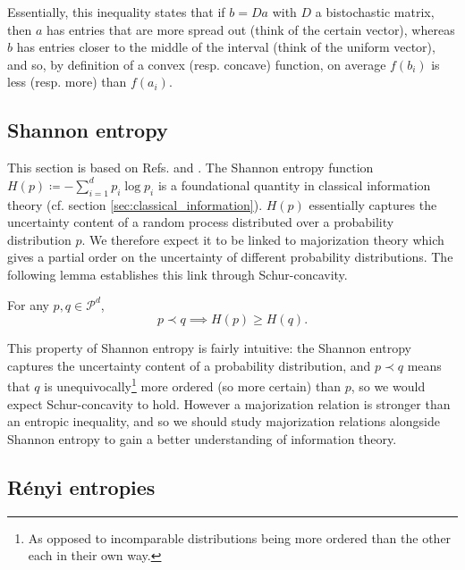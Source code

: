 Essentially, this inequality states that if $b = Da$ with $D$ a bistochastic matrix, then $a$ has entries that are more spread out (think of the certain vector), whereas $b$ has entries closer to the middle of the interval (think of the uniform vector), and so, by definition of a convex (resp. concave) function, on average $f(b_i)$ is less (resp. more) than $f(a_i)$.



\subsection{Shannon entropy} \label{sec:schur_shannon}

This section is based on Refs. \cite[p. 101]{marshall_inequalities_2011} and \cite[p. 88]{cover_elements_2006}. %
The Shannon entropy function $H(p) \coloneqq - \sum_{i = 1}^{d} p_i \log p_i$ is a foundational quantity in classical information theory (cf. section \ref{sec:classical_information}). $H(p)$ essentially captures the uncertainty content of a random process distributed over a probability distribution $p$. We therefore expect it to be linked to majorization theory which gives a partial order on the uncertainty of different probability distributions. The following lemma establishes this link through Schur-concavity.

\begin{lemma}
    For any $p, q \in \mathcal{P}^d$,
    \begin{equation}
        p \prec q \implies  H(p) \geq H(q).
    \end{equation}
\end{lemma}

This property of Shannon entropy is fairly intuitive: the Shannon entropy captures the uncertainty content of a probability distribution, and $p \prec q$ means that $q$ is unequivocally\footnote{As opposed to incomparable distributions being more ordered than the other each in their own way.} more ordered (so more certain) than $p$, so we would expect Schur-concavity to hold. However a majorization relation is stronger than an entropic inequality, and so we should study majorization relations alongside Shannon entropy to gain a better understanding of information theory.

\subsection{Rényi entropies}

